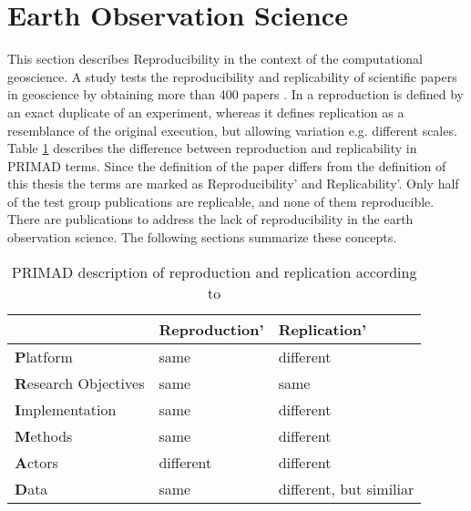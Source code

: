 \documentclass[draft,final]{vutinfth} %
\begin{document}
\section{Earth Observation Science}\label{EOScience}

This section describes Reproducibility in the context of the computational geoscience. A study tests the reproducibility and replicability of scientific papers in geoscience by obtaining more than 400 papers \cite{Ostermann2017AdvancingSW}. In \cite{Ostermann2017AdvancingSW} a reproduction is defined by an exact duplicate of an experiment, whereas it defines replication as a resemblance of the original execution, but allowing variation e.g. different scales. Table \ref{Tab:geoprimad} describes the difference between reproduction and replicability in PRIMAD terms. Since the definition of the paper differs from the definition of this thesis the terms are marked as Reproducibility' and Replicability'. Only half of the test group publications are replicable, and none of them reproducible. There are publications to address the lack of reproducibility in the earth observation science. The following sections summarize these concepts.     

\begin{table}[]
	\caption{PRIMAD description of reproduction and replication according to \cite{Ostermann2017AdvancingSW}}
	\begin{tabular}{l|l|l}
		 & \textbf{Reproduction'} & \textbf{Replication'}  \\ \hline
		\textbf{P}latform & same & different \\ \hline 
		\textbf{R}esearch Objectives & same & same \\ \hline  
		\textbf{I}mplementation  & same & different  \\ \hline  
		\textbf{M}ethods & same & different \\ \hline 
		\textbf{A}ctors & different & different \\ \hline
		\textbf{D}ata & same & different, but similiar \\ \hline
	\end{tabular}
	\label{Tab:geoprimad}
\end{table}
\end{document}
